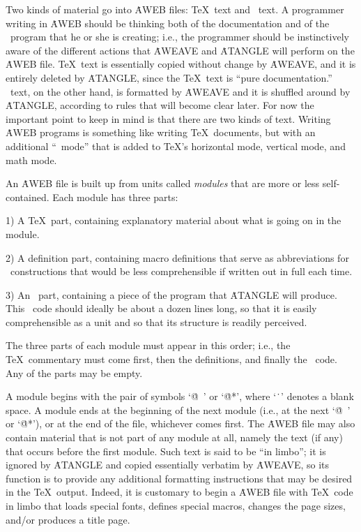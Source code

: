 Two kinds of material go into \.{AWEB} files: \TeX\ text and \ADA\ text.
A programmer writing in \.{AWEB} should be thinking both of the
documentation and of the \ADA\ program that he or she is creating;
i.e., the programmer should be instinctively aware of the different
actions that \.{AWEAVE} and \.{ATANGLE} will perform on the \.{AWEB} file.
\TeX\ text is essentially copied without change by \.{AWEAVE}, and it is
entirely deleted by \.{ATANGLE}, since the \TeX\ text is ``pure
documentation.'' \ADA\ text, on the other hand, is formatted by
\.{AWEAVE} and it is shuffled around by \.{ATANGLE}, according to rules that
will become clear later. For now the important point to keep in mind is
that there are two kinds of text. Writing \.{AWEB} programs is something
like writing \TeX\ documents, but with an additional ``\ADA\ mode''
that is added to \TeX's horizontal mode, vertical mode, and math mode.
 
An \.{AWEB} file is built up from units called {\sl modules\/} that are more
or less self-contained.  Each module has three parts:
 
\yskip\item{1)} A \TeX\ part, containing explanatory material about what
is going on in the module.
 
\item{2)} A definition part, containing macro definitions that serve as
abbreviations for \ADA\ constructions that would be less comprehensible
if written out in full each time.
 
\item{3)} An \ADA\ part, containing a piece of the program that
\.{ATANGLE} will produce. This \ADA\ code should ideally be about a
dozen lines long, so that it is easily comprehensible as a unit and so
that its structure is readily perceived.
 
\yskip\noindent The three parts of each module must appear in this order;
i.e., the \TeX\ commentary must come first, then the definitions, and
finally the \ADA\ code. Any of the parts may be empty.
 
A module begins with the pair of symbols `\.{@\ }' or `\.{@*}', where
`\.{\ }' denotes a blank space. A module ends
at the beginning of the next module (i.e., at the next
`\.{@\ }' or `\.{@*}'), or at the end of the file, whichever comes first.
The \.{AWEB} file may also contain material that is not part of any module
at all, namely the text (if any) that occurs before the first module.
Such text is said to be ``in limbo''; it is ignored by \.{ATANGLE}
and copied essentially verbatim by \.{AWEAVE}, so its function is to
provide any additional formatting instructions that may be desired in the
\TeX\ output. Indeed, it is customary to begin a \.{AWEB} file with
\TeX\ code in limbo that loads special fonts, defines special macros,
changes the page sizes, and/or produces a title page.
 
